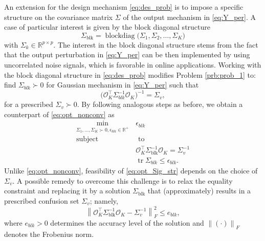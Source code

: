 \documentclass{ifacconf}
\DeclareMathOperator{\bdiag}{blockdiag}
\DeclareMathOperator{\tr}{tr}
\newcommand{\norm}[1]{\ensuremath{\left\| #1 \right\|}}
\newcommand{\calO}{\ensuremath{\mathcal{O}}}
\newcommand{\R}{\ensuremath{\mathbb R}}
\def\be{\begin{equation}}
\def\ee{\end{equation}}
\newcommand{\+}{\mathsmaller{+}}
\begin{document}
%
%
\begin{rem}\label{rem:Str_Out_Mec}
An extension for the design mechanism \eqref{eq:des_prob} is to impose a specific structure on the covariance matrix $\Sigma$ of the output mechanism in \eqref{eq:Y_per}.
A case of particular interest is given by
%
%
the block diagonal structure
	\[
	\Sigma_{\text{blk}} = \bdiag\big(\Sigma_1, \Sigma_2, \ldots, \Sigma_K \big) %
	\]
	with $\Sigma_{k} \in \R^{p\times p}$.
The interest in the block diagonal structure stems from the fact that the output perturbation in \eqref{eq:Y_per} can be then implemented by using uncorrelated noise signals, which is favorable in online applications.
Working with the block diagonal structure in \eqref{eq:des_prob} modifies Problem \ref{prb:prob_1} to: find $\Sigma_{blk} \succ 0$ for Gaussian mechanism in \eqref{eq:Y_per} such that 
	\[
	\big(\calO_K^ \top \Sigma_{blk}^{-1} \calO_K \big)^{-1} = \Sigma_v,
	\]
	for a prescribed $\Sigma_v \succ 0$. By following analogous steps as before, we obtain a counterpart of \eqref{eq:opt_nonconv} as 
%
	\be\label{eq:opt_Sig_str}
	\begin{aligned}
		\min_{\Sigma_1, \ldots, \Sigma_K \succ 0, \epsilon_{blk} \in \R^{+}}  \,& \epsilon_{blk}  \\
			\text{sub}\text{ject}& \,\, \text{to}  \\
		& \calO_K^ \top \Sigma_{\text{blk}}^{-1}\calO_K  = \Sigma_v^{-1} \\
		& \tr\Sigma_{blk} \leq \epsilon_{blk} .
	\end{aligned}
	\ee
Unlike \eqref{eq:opt_nonconv}, feasibility of \eqref{eq:opt_Sig_str} depends on the choice of $\Sigma_v$. 
%
A possible remedy to overcome this challenge is to relax the equality constraint and replacing it by a solution $\Sigma_{\text{blk}}$ that (approximately) results in a prescribed confusion set $\Sigma_v$; namely, 
%
	\[
	\norm{\calO_K^ \top \Sigma_{\text{blk}}^{-1}\calO_K  - \Sigma_v^{-1}}^{2}_{F} \leq e_{blk},
	\]
	where $e_{blk} > 0$ determines the accuracy level of the solution and  
 $\norm{(\cdot)}_{F}$ denotes the Frobenius norm.
\end{rem}

%

%
%
%
%
%
%
%
%
%
\end{document}
